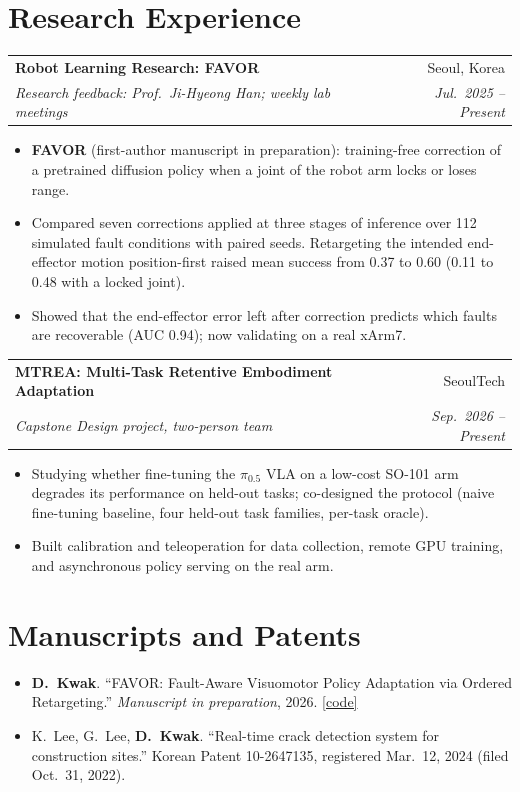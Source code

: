 \documentclass[10.5pt,a4paper]{article}
\makeatletter
\newcommand{\entry}[4]{%
  \begin{tabularx}{\textwidth}{@{}X@{\hspace{6pt}}r@{}}
    \textbf{#1} & #2\\[-1pt]
    \textit{#3} & \textit{#4}
  \end{tabularx}\vspace{-2pt}}
\newcommand{\gap}{\vspace{5pt}}
\makeatother
\begin{document}
\section{Research Experience}
\entry{Robot Learning Research: FAVOR}{Seoul, Korea}
      {Research feedback: Prof.\ Ji-Hyeong Han; weekly lab meetings}{Jul.\ 2025 -- Present}
\begin{itemize}
  \item \textbf{FAVOR} (first-author manuscript in preparation): training-free correction of a pretrained diffusion policy when a joint of the robot arm locks or loses range.
  \item Compared seven corrections applied at three stages of inference over 112 simulated fault conditions with paired seeds. Retargeting the intended end-effector motion position-first raised mean success from 0.37 to 0.60 (0.11 to 0.48 with a locked joint).
  \item Showed that the end-effector error left after correction predicts which faults are recoverable (AUC 0.94); now validating on a real xArm7.
\end{itemize}
\gap
\entry{MTREA: Multi-Task Retentive Embodiment Adaptation}{SeoulTech}
      {Capstone Design project, two-person team}{Sep.\ 2026 -- Present}
\begin{itemize}
  \item Studying whether fine-tuning the $\pi_{0.5}$ VLA on a low-cost SO-101 arm degrades its performance on held-out tasks; co-designed the protocol (naive fine-tuning baseline, four held-out task families, per-task oracle).
  \item Built calibration and teleoperation for data collection, remote GPU training, and asynchronous policy serving on the real arm.
\end{itemize}

\section{Manuscripts and Patents}
\begin{itemize}[leftmargin=28pt,labelwidth=22pt,labelsep=6pt,align=left,itemsep=3pt]
  \item [M1]\enspace \textbf{D.\ Kwak}. ``FAVOR: Fault-Aware Visuomotor Policy Adaptation via Ordered Retargeting.'' \textit{Manuscript in preparation}, 2026. \href{https://github.com/lloydkwak/FAVOR}{[code]}
  \item [P1]\enspace K.\ Lee, G.\ Lee, \textbf{D.\ Kwak}. ``Real-time crack detection system for construction sites.'' Korean Patent 10-2647135, registered Mar.\ 12, 2024 (filed Oct.\ 31, 2022).
\end{itemize}
\end{document}
